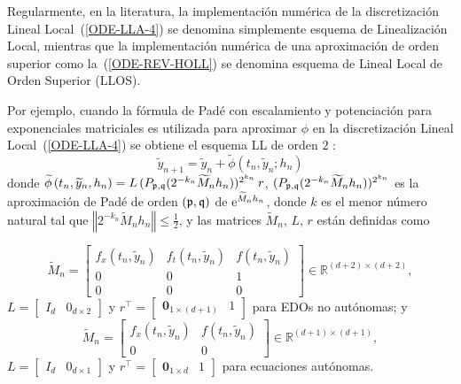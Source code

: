 Regularmente, en la literatura, la implementación numérica de la discretización Lineal Local~(\ref{ODE-LLA-4}) se denomina simplemente esquema de Linealización Local, mientras que la implementación numérica de una aproximación de orden superior como la~(\ref{ODE-REV-HOLL}) se denomina esquema de Lineal Local de Orden Superior (LLOS).

Por ejemplo, cuando la fórmula de Padé con escalamiento y potenciación para exponenciales matriciales \cite{moler2003nineteen} es utilizada para
aproximar $\phi$ en la discretización Lineal Local~(\ref{ODE-LLA-4}) se obtiene el esquema LL de orden $2$ \cite{Jimenez02AMC}:
\begin{equation} 
\widetilde{y}_{n+1}=\widetilde{y}_{n}+\widetilde{\phi}\left( t_{n},\widetilde{y}_{n};h_{n}\right) \label{LL-scheme}
\end{equation} 
donde $\widetilde{\phi }\left( t_{n},\widetilde{y}
_{n},h_{n}\right) =L\,(P_{\mathfrak{p},\mathfrak{q}}(2^{-k_{n}}\widetilde{M}_{n}h_{n}))^{2^{k_{n}}}\,r$, 
$(P_{\mathfrak{p},\mathfrak{q}}(2^{-k_{n}}\widetilde{M}_{n}h_{n}))^{2^{k_{n}}}$ es la aproximación
de Padé de orden $(\mathfrak{p},\mathfrak{q})$ de  $\mathrm{e}^{\widetilde{M}_{n}h_{n}}$, donde
$k$ es el menor número natural tal que $\left\Vert 2^{-k_{n}}\widetilde{M}_{n}h_{n}\right\Vert \leq \frac{1}{2}$, 
y las matrices $\widetilde{M}_{n}$, $L$, $r$ están definidas como

\begin{equation*}
\widetilde{M}_{n}=\left[ 
\begin{array}{ccc}
f_{x}(t_{n},\widetilde{y}_{n}) &f%
_{t}(t_{n},\widetilde{y}_{n}) & f(t_{n},\widetilde{
		y}_{n}) \\ 
0 & 0 & 1 \\ 
0 & 0 & 0%
\end{array}%
\right] \in \mathbb{R}^{(d+2)\times (d+2)},
\end{equation*}%
$L=\left[ 
\begin{array}{ll}
I_{d} & 0_{d\times 2}%
\end{array}%
\right] $ y $r^{\intercal }=\left[ 
\begin{array}{ll}
\mathbf{0}_{1\times (d+1)} & 1%
\end{array}%
\right] $ para EDOs no autónomas; y 
\begin{equation*}
\widetilde{M}_{n}=\left[ 
\begin{array}{cc}
f_{x}(t_{n},\widetilde{y}_{n}) & f(t_{n},%
\widetilde{y}_{n}) \\ 
0 & 0%
\end{array}%
\right] \in \mathbb{R}^{(d+1)\times (d+1)},
\end{equation*}%
$L=\left[ 
\begin{array}{ll}
I_{d} & 0_{d\times 1}%
\end{array}%
\right] $ y $r^{\intercal }=\left[ 
\begin{array}{ll}
\mathbf{0}_{1\times d} & 1%
\end{array}%
\right] $ para ecuaciones autónomas.

